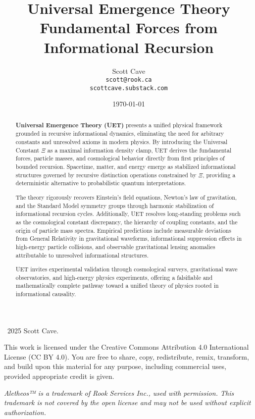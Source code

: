 \documentclass[12pt,a4paper]{article}
\title{\textbf{Universal Emergence Theory} \\ Fundamental Forces from Informational Recursion}
\author{Scott Cave \\ \texttt{scott@rook.ca} \\ \texttt{scottcave.substack.com}}
\date{\today}
\begin{document}
\maketitle
\bigskip
\begin{center}
    \textcopyright\ 2025 Scott Cave. 

    This work is licensed under the Creative Commons Attribution 4.0 International License (CC BY 4.0). 
    You are free to share, copy, redistribute, remix, transform, and build upon this material for any purpose, 
    including commercial uses, provided appropriate credit is given.

    \textit{Aletheos™ is a trademark of Rook Services Inc., used with permission. This trademark is not covered by the open license and may not be used without explicit authorization.}
\end{center}

\begin{abstract}
\noindent
\textbf{Universal Emergence Theory (UET)} presents a unified physical framework grounded in recursive informational dynamics, eliminating the need for arbitrary constants and unresolved axioms in modern physics. By introducing the Universal Constant \(\Xi\) as a maximal information density clamp, UET derives the fundamental forces, particle masses, and cosmological behavior directly from first principles of bounded recursion. Spacetime, matter, and energy emerge as stabilized informational structures governed by recursive distinction operations constrained by \(\Xi\), providing a deterministic alternative to probabilistic quantum interpretations.

The theory rigorously recovers Einstein's field equations, Newton's law of gravitation, and the Standard Model symmetry groups through harmonic stabilization of informational recursion cycles. Additionally, UET resolves long-standing problems such as the cosmological constant discrepancy, the hierarchy of coupling constants, and the origin of particle mass spectra. Empirical predictions include measurable deviations from General Relativity in gravitational waveforms, informational suppression effects in high-energy particle collisions, and observable gravitational lensing anomalies attributable to unresolved informational structures.

UET invites experimental validation through cosmological surveys, gravitational wave observatories, and high-energy physics experiments, offering a falsifiable and mathematically complete pathway toward a unified theory of physics rooted in informational causality.
\end{abstract}
\newpage
\tableofcontents
\end{document}
